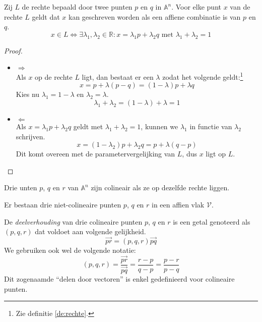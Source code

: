 \documentclass[main.tex]{subfiles}
\begin{document}
\begin{st}
  Zij $L$ de rechte bepaald door twee punten $p$ en $q$ in $\mathbb{A}^{n}$.
  Voor elke punt $x$ van de rechte $L$ geldt dat $x$ kan geschreven worden als een affiene combinatie is van $p$ en $q$.
  \[ x \in L \Leftrightarrow \exists \lambda_{1},\lambda_{2} \in \mathbb{R}: x = \lambda_{1}p + \lambda_{2}q \text{ met } \lambda_{1} + \lambda_{2} = 1 \]
  
  \begin{proof}
    \begin{itemize}
    \item $\Rightarrow$\\
      Als $x$ op de rechte $L$ ligt, dan bestaat er een $\lambda$ zodat het volgende geldt:\footnote{Zie definitie \ref{de:rechte}.}
      \[ x = p + \lambda(p - q) = (1 - \lambda)p + \lambda q \]
      Kies nu $\lambda_{1} = 1-\lambda$ en $\lambda_{2} = \lambda$.
      \[ \lambda_{1} + \lambda_{2} = (1-\lambda) + \lambda = 1 \]
    \item $\Leftarrow$\\
      Als $x = \lambda_{1}p + \lambda_{2}q$ geldt met $\lambda_{1} + \lambda_{2} = 1$, kunnen we $\lambda_{1}$ in functie van $\lambda_{2}$ schrijven.
      \[ x = (1-\lambda_{2})p + \lambda_{2}q = p + \lambda(q-p)\]
      Dit komt overeen met de parametervergelijking van $L$, dus $x$ ligt op $L$.
    \end{itemize}
  \end{proof}
\end{st}

\begin{de}
  Drie unten $p$, $q$ en $r$ van $\mathbb{A}^{n}$ zijn colineair als ze op dezelfde rechte liggen.
\end{de}

\begin{st}
  Er bestaan drie niet-colineaire punten $p$, $q$ en $r$ in een affien vlak $\mathcal{V}$.

\end{st}

\begin{de}
  De \emph{deelverhouding} van drie colineaire punten $p$, $q$ en $r$ is een getal genoteerd als $(p,q,r)$ dat voldoet aan volgende gelijkheid.
  \[ \vec{pr} = (p,q,r)\vec{pq} \]
  We gebruiken ook wel de volgende notatie:
  \[ (p,q,r) = \frac{\vec{pr}}{\vec{pq}} = \frac{r-p}{q-p} = \frac{p-r}{p-q} \]
  Dit zogenaamde ``delen door vectoren'' is enkel gedefinieerd voor colineaire punten.
\end{de}
\end{document}

